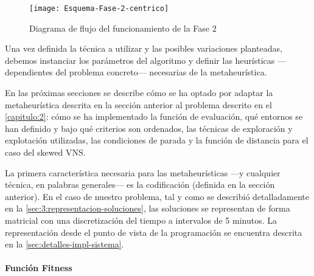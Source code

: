 \begin{figure}[htbp]
    \centering
    \texttt{[image: Esquema-Fase-2-centrico]}
    \caption{Diagrama de flujo del funcionamiento de la Fase 2}
    \label{fig:esquema-fase2}
\end{figure}

\vspace*{\fill}

Una vez definida la técnica a utilizar y las posibles variaciones planteadas, debemos instanciar los parámetros del algoritmo y definir las heurísticas ---dependientes del problema concreto--- necesarias de la metaheurística.

En las próximas secciones se describe cómo se ha optado por adaptar la metaheurística descrita en la sección anterior al problema descrito en el \autoref{capitulo:2}: cómo se ha implementado la función de evaluación, qué entornos se han definido y bajo qué criterios son ordenados, las técnicas de exploración y explotación utilizadas, las condiciones de parada y la función de distancia para el caso del skewed VNS.

La primera característica necesaria para las metaheurísticas ---y cualquier técnica, en palabras generales--- es la codificación (definida en la sección anterior). En el caso de nuestro problema, tal y como se describió detalladamente en la \autoref{sec:3:representacion-soluciones}, las soluciones se representan de forma matricial con una discretización del tiempo a intervalos de 5 minutos. La representación desde el punto de vista de la programación se encuentra descrita en la \autoref{sec:detalles-impl-sistema}. %




\paragraph{Función Fitness} \label{apartado:adaptacion-fitness}

